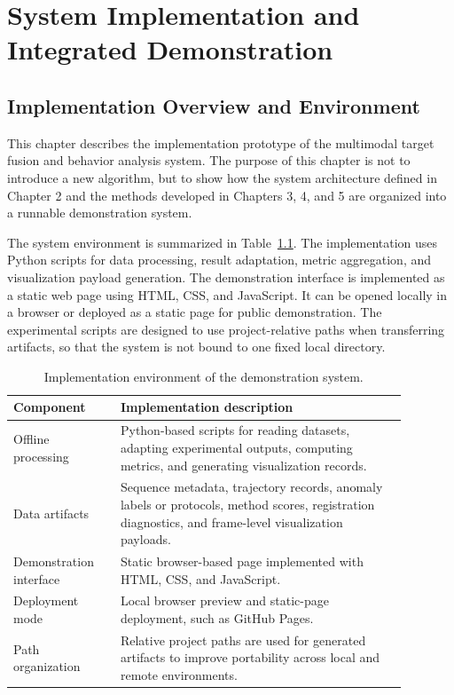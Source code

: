 \chapter{System Implementation and Integrated Demonstration}

\section{Implementation Overview and Environment}
This chapter describes the implementation prototype of the multimodal target fusion and behavior analysis system. The purpose of this chapter is not to introduce a new algorithm, but to show how the system architecture defined in Chapter 2 and the methods developed in Chapters 3, 4, and 5 are organized into a runnable demonstration system.

The system environment is summarized in Table~\ref{tab:chapter6-env}. The implementation uses Python scripts for data processing, result adaptation, metric aggregation, and visualization payload generation. The demonstration interface is implemented as a static web page using HTML, CSS, and JavaScript. It can be opened locally in a browser or deployed as a static page for public demonstration. The experimental scripts are designed to use project-relative paths when transferring artifacts, so that the system is not bound to one fixed local directory.

\begin{table}[H]
  \centering
  \caption{Implementation environment of the demonstration system.}
  \label{tab:chapter6-env}
  \setlength{\tabcolsep}{4pt}
  \renewcommand{\arraystretch}{0.95}
  \small
  \begin{tabular}{p{0.24\linewidth}p{0.64\linewidth}}
    \toprule
    Component & Implementation description \\
    \midrule
    Offline processing & Python-based scripts for reading datasets, adapting experimental outputs, computing metrics, and generating visualization records. \\
    Data artifacts & Sequence metadata, trajectory records, anomaly labels or protocols, method scores, registration diagnostics, and frame-level visualization payloads. \\
    Demonstration interface & Static browser-based page implemented with HTML, CSS, and JavaScript. \\
    Deployment mode & Local browser preview and static-page deployment, such as GitHub Pages. \\
    Path organization & Relative project paths are used for generated artifacts to improve portability across local and remote environments. \\
    \bottomrule
  \end{tabular}
\end{table}

